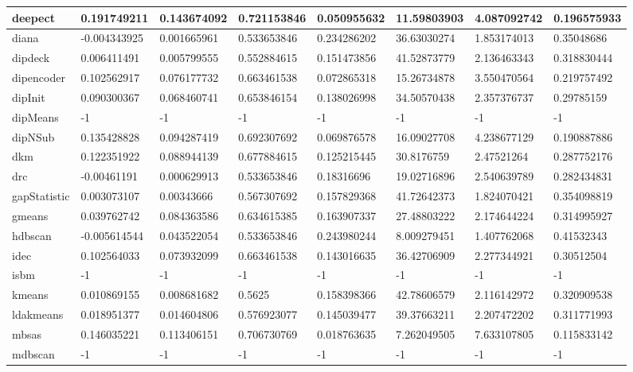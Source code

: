 \begin{table}[H]
\begin{tabular}{|l|l|l|l|l|l|l|l|}
\hline
deepect & 0.191749211 & 0.143674092 & 0.721153846 & 0.050955632 & 11.59803903 & 4.087092742 & 0.196575933 \\
\hline
diana & -0.004343925 & 0.001665961 & 0.533653846 & 0.234286202 & 36.63030274 & 1.853174013 & 0.35048686 \\
\hline
dipdeck & 0.006411491 & 0.005799555 & 0.552884615 & 0.151473856 & 41.52873779 & 2.136463343 & 0.318830444 \\
\hline
dipencoder & 0.102562917 & 0.076177732 & 0.663461538 & 0.072865318 & 15.26734878 & 3.550470564 & 0.219757492 \\
\hline
dipInit & 0.090300367 & 0.068460741 & 0.653846154 & 0.138026998 & 34.50570438 & 2.357376737 & 0.29785159 \\
\hline
dipMeans & -1 & -1 & -1 & -1 & -1 & -1 & -1 \\
\hline
dipNSub & 0.135428828 & 0.094287419 & 0.692307692 & 0.069876578 & 16.09027708 & 4.238677129 & 0.190887886 \\
\hline
dkm & 0.122351922 & 0.088944139 & 0.677884615 & 0.125215445 & 30.8176759 & 2.47521264 & 0.287752176 \\
\hline
drc & -0.00461191 & 0.000629913 & 0.533653846 & 0.18316696 & 19.02716896 & 2.540639789 & 0.282434831 \\
\hline
gapStatistic & 0.003073107 & 0.00343666 & 0.567307692 & 0.157829368 & 41.72642373 & 1.824070421 & 0.354098819 \\
\hline
gmeans & 0.039762742 & 0.084363586 & 0.634615385 & 0.163907337 & 27.48803222 & 2.174644224 & 0.314995927 \\
\hline
hdbscan & -0.005614544 & 0.043522054 & 0.533653846 & 0.243980244 & 8.009279451 & 1.407762068 & 0.41532343 \\
\hline
idec & 0.102564033 & 0.073932099 & 0.663461538 & 0.143016635 & 36.42706909 & 2.277344921 & 0.30512504 \\
\hline
isbm & -1 & -1 & -1 & -1 & -1 & -1 & -1 \\
\hline
kmeans & 0.010869155 & 0.008681682 & 0.5625 & 0.158398366 & 42.78606579 & 2.116142972 & 0.320909538 \\
\hline
ldakmeans & 0.018951377 & 0.014604806 & 0.576923077 & 0.145039477 & 39.37663211 & 2.207472202 & 0.311771993 \\
\hline
mbsas & 0.146035221 & 0.113406151 & 0.706730769 & 0.018763635 & 7.262049505 & 7.633107805 & 0.115833142 \\
\hline
mdbscan & -1 & -1 & -1 & -1 & -1 & -1 & -1 \\
\hline

\end{tabular}
\end{table}
